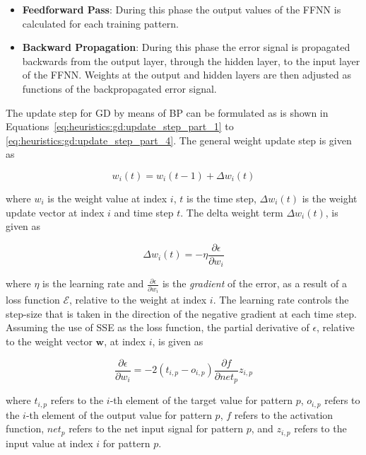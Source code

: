 \begin{itemize}
	\item \textbf{Feedforward Pass}: During this phase the output values of the \acs{FFNN} is calculated for each training pattern.

	\item \textbf{Backward Propagation}: During this phase the error signal is propagated backwards from the output layer, through the hidden layer, to the input layer of the \acs{FFNN}. Weights at the output and hidden layers are then adjusted as functions of the backpropagated error signal.
\end{itemize}

The update step for \acs{GD} by means of \acs{BP} can be formulated as is shown in Equations~\eqref{eq:heuristics:gd:update_step_part_1} to \eqref{eq:heuristics:gd:update_step_part_4}. The general weight update step is given as

\begin{equation}
	\label{eq:heuristics:gd:update_step_part_1}
	w_{i}(t) = w_{i}(t-1) + \Delta w_{i}(t)
\end{equation}

where $w_{i}$ is the weight value at index $i$, $t$ is the time step, $\Delta w_{i}(t)$ is the weight update vector at index $i$ and time step $t$. The delta weight term $\Delta w_{i}(t)$, is given as

\begin{equation}
	\label{eq:heuristics:gd:update_step_part_2}
	\Delta w_{i}(t) = -\eta\frac{\partial \epsilon}{\partial w_{i}}
\end{equation}

where $\eta$ is the learning rate and $\frac{\partial \epsilon}{\partial w_{i}}$ is the \textit{gradient} of the error, as a result of a loss function $\mathcal{E}$, relative to the weight at index $i$. The learning rate controls the step-size that is taken in the direction of the negative gradient at each time step. Assuming the use of \acs{SSE} as the loss function, the partial derivative of $\epsilon$, relative to the weight vector $\boldsymbol{w}$, at index $i$, is given as

\begin{equation}
	\label{eq:heuristics:gd:update_step_part_3}
	\frac{\partial \epsilon}{\partial w_{i}} = -2(t_{i,p} - o_{i,p})\frac{\partial f}{\partial net_{p}}z_{i,p}
\end{equation}

where $t_{i,p}$ refers to the $i$-th element of the target value for pattern $p$, $o_{i,p}$ refers to the $i$-th element of the output value for pattern $p$, $f$ refers to the activation function, $net_{p}$ refers to the net input signal for pattern $p$, and $z_{i,p}$ refers to the input value at index $i$ for pattern $p$.

